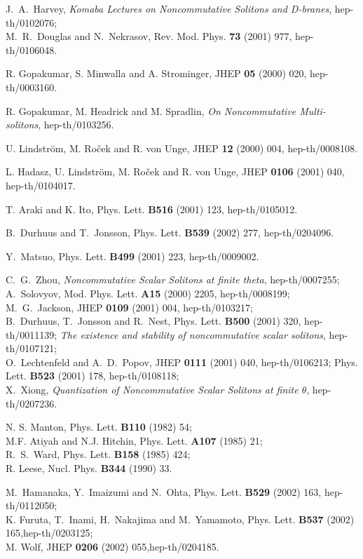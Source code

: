 \documentclass[a4paper,12pt]{article}
\begin{document}
\begin{thebibliography}{99}
J.~A.~Harvey, {\it Komaba Lectures on Noncommutative Solitons and
 D-branes},
hep-th/0102076;\\
M.~R.~Douglas and N.~Nekrasov, Rev. Mod. Phys. {\bf 73} (2001) 977,
hep-th/0106048.


 R. Gopakumar, S. Minwalla and A. Strominger,
 JHEP {\bf 05} (2000) 020, hep-th/0003160.


 R. Gopakumar, M. Headrick and M. Spradlin,
 {\it On Noncommutative Multi-solitons},
 hep-th/0103256.

 U. Lindstr\"om, M. Ro\v{c}ek and R. von Unge,
 JHEP {\bf 12} (2000) 004, hep-th/0008108.

L. Hadasz, U. Lindstr\"om, M. Ro\v{c}ek and R. von Unge,
JHEP {\bf 0106} (2001) 040, hep-th/0104017.

T. Araki and K. Ito, Phys. Lett. {\bf B516} (2001) 123, hep-th/0105012.

B.~Durhuus and T.~Jonsson, Phys. Lett. {\bf B539} (2002) 277,
hep-th/0204096.

Y.~Matsuo, Phys. Lett. {\bf B499} (2001) 223, hep-th/0009002.

C.~G.~Zhou, {\it Noncommutative Scalar Solitons at finite theta},
hep-th/0007255;\\
A.~Solovyov, Mod. Phys. Lett. {\bf A15} (2000) 2205, hep-th/0008199;\\
M.~G.~Jackson, JHEP {\bf 0109} (2001) 004, hep-th/0103217;\\
B.~Durhuus, T.~Jonsson and R.~Nest, Phys. Lett. {\bf B500} (2001) 320,
 hep-th/0011139; {\it The existence and stability of
 noncommutative scalar solitons}, hep-th/0107121;\\
O.~Lechtenfeld and A.~D.~Popov, JHEP {\bf 0111} (2001) 040,
 hep-th/0106213;
Phys. Lett. {\bf B523} (2001) 178, hep-th/0108118;\\
X.~Xiong, {\it Quantization of Noncommutative Scalar Solitons at finite
$\theta$}, hep-th/0207236.



 N. S. Manton,
 Phys. Lett. {\bf B110} (1982) 54;  \\
 M.F. Atiyah and N.J. Hitchin, Phys. Lett. {\bf A107} (1985) 21;\\
 R.~S.~Ward, Phys. Lett. {\bf B158} (1985) 424;\\
 R. Leese,
 Nucl. Phys. {\bf B344} (1990) 33.

M.~Hamanaka, Y.~Imaizumi and N.~Ohta, Phys. Lett. {\bf B529} (2002) 163,
hep-th/0112050;\\
K. Furuta, T.~Inami, H.~Nakajima and M.~Yamamoto, Phys. Lett. {\bf B537}
(2002) 165,hep-th/0203125;\\
M. Wolf, JHEP {\bf 0206} (2002) 055,hep-th/0204185.


\end{thebibliography}
\end{document}
